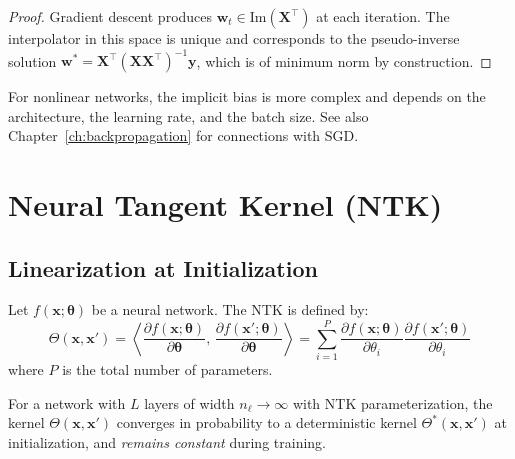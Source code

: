 \begin{proof}
Gradient descent produces $\mathbf{w}_t \in \text{Im}(\mathbf{X}^\top)$
at each iteration. The interpolator in this space is unique and
corresponds to the pseudo-inverse solution $\mathbf{w}^* = \mathbf{X}^\top(\mathbf{X}\mathbf{X}^\top)^{-1}\mathbf{y}$,
which is of minimum norm by construction.
\end{proof}

\begin{remark}
For nonlinear networks, the implicit bias is more complex
and depends on the architecture, the learning rate, and the batch
size. See also Chapter~\ref{ch:backpropagation} for
connections with SGD.
\end{remark}

\section{Neural Tangent Kernel (NTK)}
\label{sec:ntk}

\subsection{Linearization at Initialization}

\begin{definition}
\label{def:ntk}
Let $f(\mathbf{x}; \boldsymbol{\theta})$ be a neural network. The NTK
is defined by:
\begin{equation}
\Theta(\mathbf{x}, \mathbf{x}') = \left\langle \frac{\partial f(\mathbf{x}; \boldsymbol{\theta})}{\partial \boldsymbol{\theta}},\, \frac{\partial f(\mathbf{x}'; \boldsymbol{\theta})}{\partial \boldsymbol{\theta}} \right\rangle = \sum_{i=1}^{P} \frac{\partial f(\mathbf{x}; \boldsymbol{\theta})}{\partial \theta_i} \frac{\partial f(\mathbf{x}'; \boldsymbol{\theta})}{\partial \theta_i}
\end{equation}
where $P$ is the total number of parameters.
\end{definition}

\begin{theorem}
\label{thm:ntk-convergence}
For a network with $L$ layers of width $n_\ell \to \infty$ with
NTK parameterization, the kernel $\Theta(\mathbf{x}, \mathbf{x}')$
converges in probability to a deterministic kernel $\Theta^*(\mathbf{x}, \mathbf{x}')$
at initialization, and \emph{remains constant} during training.
\end{theorem}

